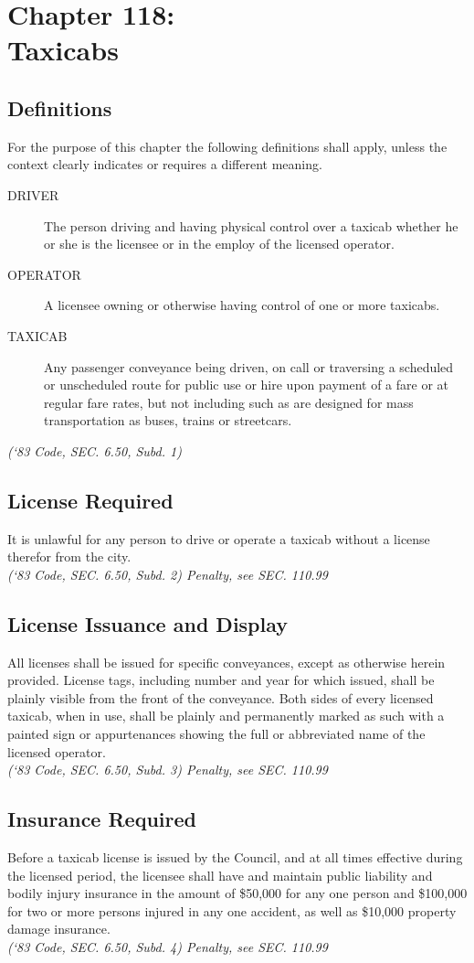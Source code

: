 \chapter*{Chapter 118: \\
	Taxicabs}
    \minitoc
    \pagebreak

\section{Definitions}
For the purpose of this chapter the following definitions shall apply, unless the context clearly indicates or requires a different meaning.
\begin{description}
    \item[DRIVER] The person driving and having physical control over a taxicab whether he or she is the licensee or in the employ of the licensed operator.
    \item[OPERATOR] A licensee owning or otherwise having control of one or more taxicabs.
    \item[TAXICAB] Any passenger conveyance being driven, on call or traversing a scheduled or unscheduled route for public use or hire upon payment of a fare or at regular fare rates, but not including such as are designed for mass transportation as buses, trains or streetcars.
\end{description}
\emph{(‘83 Code, SEC. 6.50, Subd. 1)}
\section{License Required}
It is unlawful for any person to drive or operate a taxicab without a license therefor from the city.\\
\emph{(‘83 Code, SEC. 6.50, Subd. 2)  Penalty, see SEC. 110.99}
\section{License Issuance and Display}
All licenses shall be issued for specific conveyances, except as otherwise herein provided.  License tags, including number and year for which issued, shall be plainly visible from the front of the conveyance.  Both sides of every licensed taxicab, when in use, shall be plainly and permanently marked as such with a painted sign or appurtenances showing the full or abbreviated name of the licensed operator.\\
\emph{(‘83 Code, SEC. 6.50, Subd. 3)  Penalty, see SEC. 110.99}
\section{Insurance Required}
Before a taxicab license is issued by the Council, and at all times effective during the licensed period, the licensee shall have and maintain public liability and bodily injury insurance in the amount of \$50,000 for any one person and \$100,000 for two or more persons injured in any one accident, as well as \$10,000 property damage insurance.\\
\emph{(‘83 Code, SEC. 6.50, Subd. 4)  Penalty, see SEC. 110.99}
